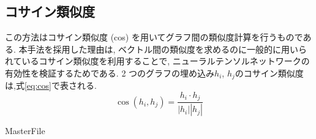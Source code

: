 \documentclass[a4j,twoside,12pt, dvipdfmx]{thesis} %
\begin{document}
\subsection{コサイン類似度}
この方法はコサイン類似度 (cos) を用いてグラフ間の類似度計算を行うものである.
本手法を採用した理由は, ベクトル間の類似度を求めるのに一般的に用いられているコサイン類似度を利用することで, ニューラルテンソルネットワークの有効性を検証するためである.
2 つのグラフの埋め込み$h_{i}$, $h_{j}$のコサイン類似度は,式\ref{eq:cos}で表される.
\begin{equation}
  \label{eq:cos}
  \cos(h_{i}, h_{j}) = \dfrac{h_{i} \cdot h_{j}}{|h_{i} | | h_{j}|}
\end{equation}

\expandafter\ifx\csname MasterFile\endcsname\relax
\def\MasterFile{本原稿です}

%



\end{document}
